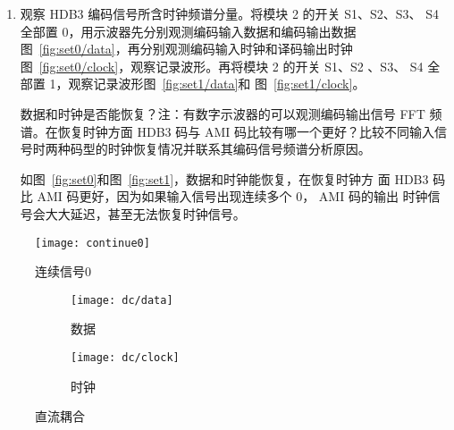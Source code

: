 \documentclass[../main]{subfiles}
\begin{document}
\begin{enumerate}
    \begin{Exercise}[title = 思考]
      HDB3 码是否存在直流分量？
    \end{Exercise}

    \begin{Answer}
      HDB3 码不存在直流分量。由直流耦合图~\ref{fig:dc}和交流耦合
      图~\ref{fig:ac}，可以发现区别不大，从而佐证这一点。
    \end{Answer}

  \item 观察 HDB3 编码信号所含时钟频谱分量。将模块 2 的开关 S1、S2、S3、
    S4 全部置 0，用示波器先分别观测编码输入数据和编码输出数据
    图~\ref{fig:set0/data}，再分别观测编码输入时钟和译码输出时钟
    图~\ref{fig:set0/clock}，观察记录波形。再将模块 2 的开关 S1、S2 、S3、
    S4 全部置 1，观察记录波形图~\ref{fig:set1/data}和
    图~\ref{fig:set1/clock}。

    \begin{Exercise}[title = 思考]
      数据和时钟是否能恢复？注：有数字示波器的可以观测编码输出信号 FFT 频
      谱。在恢复时钟方面 HDB3 码与 AMI 码比较有哪一个更好？比较不同输入信
      号时两种码型的时钟恢复情况并联系其编码信号频谱分析原因。
    \end{Exercise}

    \begin{Answer}
      如图~\ref{fig:set0}和图~\ref{fig:set1}，数据和时钟能恢复，在恢复时钟方
      面 HDB3 码比 AMI 码更好，因为如果输入信号出现连续多个 0， AMI 码的输出
      时钟信号会大大延迟，甚至无法恢复时钟信号。
    \end{Answer}
\end{enumerate}

\begin{figure}[htbp]
  \centering
  \texttt{[image: continue0]}
  \caption{连续信号0}%
  \label{fig:continue0}
\end{figure}

\begin{figure}[htbp]
  \centering
  \begin{subfigure}[htbp]{0.45\linewidth}
    \centering
    \texttt{[image: dc/data]}
    \caption{数据}%
    \label{fig:dc/data}
  \end{subfigure}
  \quad
  \begin{subfigure}[htbp]{0.45\linewidth}
    \centering
    \texttt{[image: dc/clock]}
    \caption{时钟}%
    \label{fig:dc/clock}
  \end{subfigure}
  \caption{直流耦合}%
  \label{fig:dc}
\end{figure}
\end{document}
